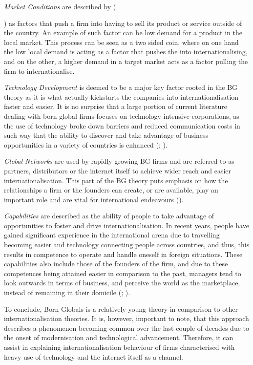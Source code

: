 \documentclass[11pt,a4paper]{article}
\begin{document}
{\textit{Market Conditions} are described by \citeauthor{madsenInternationalizationBornGlobals1997} ({\citeyear{madsenInternationalizationBornGlobals1997}) as factors that push a firm into having to sell its product or service outside of the country. An example of such factor can be low demand for a product in the local market. This process can be seen as a two sided coin, where on one hand the low local demand is acting as a factor that pushes the into internationalising, and on the other, a higher demand in a target market acts as a factor pulling the firm to internationalise. \par
\textit{Technology Development} is deemed to be a major key factor rooted in the BG theory as it is what actually kickstarts the companies into internationalisation faster and easier. It is no surprise that a large portion of current literature dealing with born global firms focuses on technology-intensive corporations, as the use of technology broke down barriers and reduced communication costs in such way that the ability to discover and take advantage of business opportunities in a variety of countries is enhanced (\cite{oviattTheoryInternationalNew1994}; \cite{knightInternationalizationIncrementalBorn2016}). \par
\textit{Global Networks} are used by rapidly growing BG firms and are referred to as partners, distributors or the internet itself to achieve wider reach and easier internationalisation. This part of the BG theory puts emphasis on how the relationships a firm or the founders can create, or are available, play an important role and are vital for international endeavours (\cite{fletcherInternationalEntrepreneurshipBorn2011}). \par
\textit{Capabilities} are described as the ability of people to take advantage of opportunities to foster and drive internationalisation. In recent years, people have gained significant experience in the international arena due to travelling becoming easier and technology connecting people across countries, and thus, this results in competence to operate and handle oneself in foreign situations. These capabilities also include those of the founders of the firm, and due to these competences being attained easier in comparison to the past, managers tend to look outwards in terms of business, and perceive the world as the marketplace, instead of remaining in their domicile (\cite{madsenInternationalizationBornGlobals1997}; \cite{rialpBornglobalPhenomenonComparative2005}). \par
To conclude, Born Globals is a relatively young theory in comparison to other internationalisation theories. It is, however, important to note, that this approach describes a phenomenon becoming common over the last couple of decades due to the onset of modernisation and technological advancement. Therefore, it can assist in explaining internationalisation behaviour of firms characterised with heavy use of technology and the internet itself as a channel. 



}}
\end{document}

